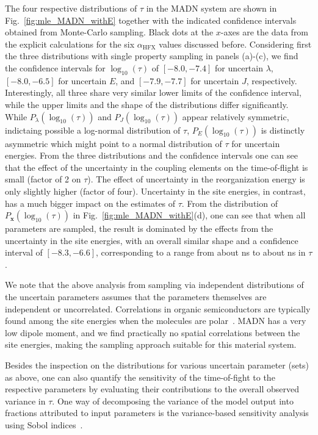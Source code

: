 \documentclass[%
 reprint,
superscriptaddress,
 amsmath,amssymb,
 aps,
prb,
floatfix
]{revtex4-2}
\newcommand{\ahfx}{\ensuremath{\alpha_\text{HFX}}\xspace}
\begin{document}
The four respective distributions of $\tau$ in the MADN system are shown in Fig.~\ref{fig:mle_MADN_withE} together with the indicated confidence intervals obtained from Monte-Carlo sampling. Black dots at the $x$-axes are the data from the explicit calculations for the six \ahfx values discussed before. Considering first the three distributions with single property sampling in panels (a)-(c), we find the confidence intervals for $\log_{10}(\tau)$ of $[-8.0,-7.4]$ for uncertain $\lambda$, $[-8.0,-6.5]$ for uncertain $E$, and $[-7.9,-7.7]$ for uncertain $J$, respectively. Interestingly, all three share very similar lower limits of the confidence interval, while the upper limits and the shape of the distributions differ significantly. While $P_\lambda(\log_{10}(\tau))$ and $P_J(\log_{10}(\tau))$ appear relatively symmetric, indictaing possible a log-normal distribution of $\tau$, $P_E(\log_{10}(\tau))$ is distinctly asymmetric which might point to a normal distribution of $\tau$ for uncertain energies. From the three distributions and the confidence intervals one can see that the effect of the uncertainty in the coupling elements on the time-of-flight is small (factor of 2 on $\tau$). The effect of uncertainty in the reorganization energy is only slightly higher (factor of four). Uncertainty in the site energies, in contrast, has a much bigger impact on the estimates of $\tau$. From the distribution of $P_\mathbf{x}(\log_{10}(\tau))$ in Fig.~\ref{fig:mle_MADN_withE}(d), one can see that when all parameters are sampled, the result is dominated by the effects from the uncertainty in the site energies, with an overall similar shape and a confidence interval of $[-8.3,-6.6]$, corresponding to a range from about \unit[5]{ns} to about \unit[250]{ns} in $\tau$. 

We note that the above analysis from sampling via independent distributions of the uncertain parameters assumes that the parameters themselves are independent or uncorrelated. Correlations in organic semiconductors are typically found among the site energies when the molecules are polar~\cite{Baumeier2011,10.1063/5.0049513}. MADN has a very low dipole moment, and we find practically no spatial correlations between the site energies, making the sampling approach suitable for this material system.

Besides the inspection on the distributions for various uncertain parameter (sets) as above, one can also quantify the sensitivity of the time-of-fight to the respective parameters by evaluating their contributions to the overall observed variance in $\tau$. One way of decomposing the variance of the model output into fractions attributed to input parameters is the variance-based sensitivity analysis using Sobol indices~\cite{saltelli_variance_2010}. 
\end{document}
